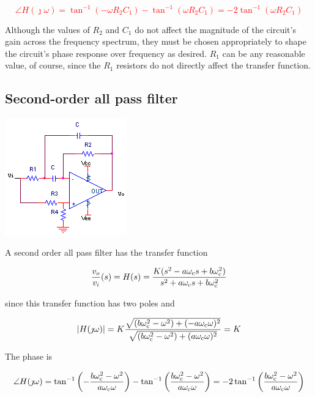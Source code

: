 \textcolor{red}{
\begin{equation}
\angle H(\jmath\omega) = \tan^{-1}(-\omega R_2 C_1) - \tan^{-1}(\omega R_2 C_1) = -2\tan^{-1}(\omega R_2 C_1)
\label{eq:1storderallpassfilter_angle}
\end{equation}
}

Although the values of $R_2$ and $C_1$ do not affect the magnitude of the circuit's gain across the frequency spectrum, they must be chosen appropriately to shape the circuit's phase response over frequency as desired.
$R_1$ can be any reasonable value, of course, since the $R_1$ resistors do not directly affect the transfer function.

\subsection{Second-order all pass filter}
\begin{center}
	\includegraphics{schematics/2ndorder_allpass.PNG}
\end{center}
A second order all pass filter has the transfer function

\textcolor{red}{
\begin{equation}
\frac{\vout}{\vin}(s) = H(s) = \frac{K(s^2 - a\wcutoff s + b\wcutoff^2)}{s^2 + a\wcutoff s + b\wcutoff^2}
\label{eq:2ndorder_allpass}
\end{equation}
}

since this transfer function has two poles and

\begin{equation}
\lvert H(\jmath\omega)\rvert = K\frac{\sqrt{(b\omega_\mathrm{c}^2-\omega^2) + (-a\omega_\mathrm{c}\omega)^2}}{\sqrt{(b\omega_\mathrm{c}^2-\omega^2) + (a\omega_\mathrm{c}\omega)^2}} = K
\end{equation}

The phase is

\textcolor{red}{
\begin{equation}
\angle H(\jmath\omega) = \tan^{-1}\left(-\frac{b\omega_\mathrm{c}^2-\omega^2}{a\omega_\mathrm{c}\omega}\right) - \tan^{-1}\left(\frac{b\omega_\mathrm{c}^2-\omega^2}{a\omega_\mathrm{c}\omega}\right) = -2\tan^{-1}\left(\frac{b\omega_\mathrm{c}^2-\omega^2}{a\omega_\mathrm{c}\omega}\right)
\label{eq:2ndorder_allpass_angle}
\end{equation}
}

